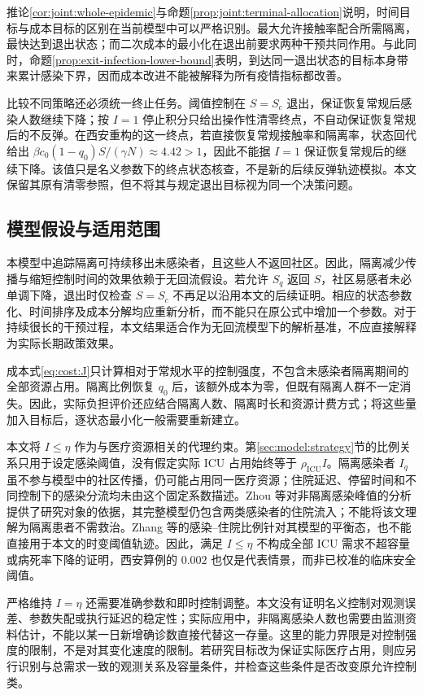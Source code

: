 \documentclass[lang=cn,a4paper,newtx]{elegantpaper}
\numberwithin{equation}{section}
\theoremstyle{plain}
\begin{document}
推论\ref{cor:joint:whole-epidemic}与命题\ref{prop:joint:terminal-allocation}说明，时间目标与成本目标的区别在当前模型中可以严格识别。最大允许接触率配合所需隔离，最快达到退出状态；而二次成本的最小化在退出前要求两种干预共同作用。与此同时，命题\ref{prop:exit-infection-lower-bound}表明，到达同一退出状态的目标本身带来累计感染下界，因而成本改进不能被解释为所有疫情指标都改善。

比较不同策略还必须统一终止任务。阈值控制在 $S=S_c$ 退出，保证恢复常规后感染人数继续下降；按 $I=1$ 停止积分只给出操作性清零终点，不自动保证恢复常规后的不反弹。在西安重构的这一终点，若直接恢复常规接触率和隔离率，状态回代给出 $\beta c_0(1-q_0)S/(\gamma N)\approx4.42>1$，因此不能据 $I=1$ 保证恢复常规后的继续下降。该值只是名义参数下的终点状态核查，不是新的后续反弹轨迹模拟。本文保留其原有清零参照，但不将其与规定退出目标视为同一个决策问题。

\subsection{模型假设与适用范围}
本模型中追踪隔离可持续移出未感染者，且这些人不返回社区。因此，隔离减少传播与缩短控制时间的效果依赖于无回流假设。若允许 $S_q$ 返回 $S$，社区易感者未必单调下降，退出时仅检查 $S=S_c$ 不再足以沿用本文的后续证明。相应的状态参数化、时间排序及成本分解均应重新分析，而不能只在原公式中增加一个参数。对于持续很长的干预过程，本文结果适合作为无回流模型下的解析基准，不应直接解释为实际长期政策效果。

成本式\eqref{eq:cost:J}只计算相对于常规水平的控制强度，不包含未感染者隔离期间的全部资源占用。隔离比例恢复 $q_0$ 后，该额外成本为零，但既有隔离人群不一定消失。因此，实际负担评价还应结合隔离人数、隔离时长和资源计费方式；将这些量加入目标后，逐状态最小化一般需要重新建立。

本文将 $I\le\eta$ 作为与医疗资源相关的代理约束。第\ref{sec:model:strategy}节的比例关系只用于设定感染阈值，没有假定实际 ICU 占用始终等于 $\rho_{\mathrm{ICU}}I$。隔离感染者 $I_q$ 虽不参与模型中的社区传播，仍可能占用同一医疗资源；住院延迟、停留时间和不同控制下的感染分流均未由这个固定系数描述。Zhou 等\cite{Zhou2024SPCI}对非隔离感染峰值的分析提供了研究对象的依据，其完整模型仍包含两类感染者的住院流入；不能将该文理解为隔离患者不需救治。Zhang 等\cite[注记1]{Zhang2026Behavior}的感染--住院比例针对其模型的平衡态，也不能直接用于本文的时变阈值轨迹。因此，满足 $I\le\eta$ 不构成全部 ICU 需求不超容量或病死率下降的证明，西安算例的 $0.002$ 也仅是代表情景，而非已校准的临床安全阈值。

严格维持 $I=\eta$ 还需要准确参数和即时控制调整。本文没有证明名义控制对观测误差、参数失配或执行延迟的稳定性；实际应用中，非隔离感染人数也需要由监测资料估计，不能以某一日新增确诊数直接代替这一存量。这里的能力界限是对控制强度的限制，不是对其变化速度的限制。若研究目标改为保证实际医疗占用，则应另行识别与总需求一致的观测关系及容量条件，并检查这些条件是否改变原允许控制类。
\end{document}

